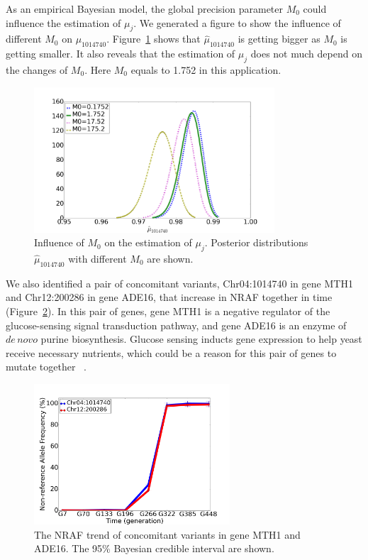 \documentclass[11pt,reqno]{amsart}
\begin{document}
As an empirical Bayesian model, the global precision parameter $M_0$ could influence the estimation of $\mu_j$.
We generated a figure to show the influence of different $M_0$ on $\mu_{1014740}$.
Figure~\ref{tbl:M0} shows that $\hat{\mu}_{1014740}$ is getting bigger as $M_0$ is getting smaller.
It also reveals that the estimation of $\mu_j$ does not much depend on the changes of $M_0$.
Here $M_0$ equals to 1.752 in this application.
\begin{figure}[htbp]
\centering
\includegraphics[width=0.8\textwidth]{figs/diff_M0.png}
\caption{Influence of $M_0$ on the estimation of $\mu_j$.
Posterior distributions $\hat{\mu}_{1014740}$ with different $M_0$ are shown.}
\label{tbl:M0}
\end{figure}

We also identified a pair of concomitant variants, Chr04:1014740 in gene MTH1 and Chr12:200286 in gene ADE16, that increase in NRAF together in time (Figure~\ref{tbl:concomitant}).
In this pair of genes, gene MTH1 is a negative regulator of the glucose-sensing signal transduction pathway, and gene ADE16 is an enzyme of $\mathit{de\, novo}$ purine biosynthesis.
Glucose sensing inducts gene expression to help yeast receive necessary nutrients, which could be a reason for this pair of genes to mutate together ~\citep{johnston1999feasting}.
\begin{figure}[htbp]
\centering
\includegraphics[width=0.65\textwidth]{figs/concomitant.png}
\caption{The NRAF trend of concomitant variants in gene MTH1 and ADE16.
The 95\% Bayesian credible interval are shown.}
\label{tbl:concomitant}
\end{figure}
\end{document}
